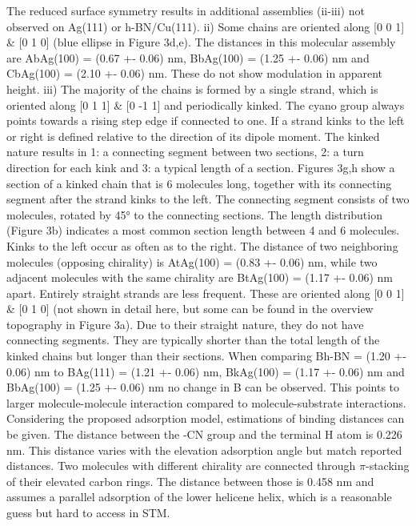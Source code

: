 The reduced surface symmetry results in additional assemblies (ii-iii) not observed on Ag(111) or h-BN/Cu(111). ii) Some chains are oriented along [0 0 1] \& [0 1 0] (blue ellipse in Figure 3d,e). The distances in this molecular assembly are AbAg(100) = (0.67 +- 0.06) nm, BbAg(100) = (1.25 +- 0.06) nm and CbAg(100) = (2.10 +- 0.06) nm. These do not show modulation in apparent height. iii) The majority of the chains is formed by a single strand, which is oriented along [0 1 1] \& [0 -1 1] and periodically kinked. The cyano group always points towards a rising step edge if connected to one. If a strand kinks to the left or right is defined relative to the direction of its dipole moment. The kinked nature results in 1: a connecting segment between two sections, 2: a turn direction for each kink and 3: a typical length of a section. Figures 3g,h show a section of a kinked chain that is 6 molecules long, together with its connecting segment after the strand kinks to the left. The connecting segment consists of two molecules, rotated by 45° to the connecting sections. The length distribution (Figure 3b) indicates a most common section length between 4 and 6 molecules. Kinks to the left occur as often as to the right. The distance of two neighboring molecules (opposing chirality) is AtAg(100) = (0.83 +- 0.06) nm, while two adjacent molecules with the same chirality are BtAg(100) = (1.17 +- 0.06) nm apart. Entirely straight strands are less frequent. These are oriented along [0 0 1] \& [0 1 0] (not shown in detail here, but some can be found in the overview topography in Figure 3a). Due to their straight nature, they do not have connecting segments. They are typically shorter than the total length of the kinked chains but longer than their sections. When comparing Bh-BN = (1.20 +- 0.06) nm to BAg(111) = (1.21 +- 0.06) nm, BkAg(100) = (1.17 +- 0.06) nm and BbAg(100) = (1.25 +- 0.06) nm no change in B can be observed. This points to larger molecule-molecule interaction compared to molecule-substrate interactions. Considering the proposed adsorption model, estimations of binding distances can be given. The distance between the -CN group and the terminal H atom is 0.226 nm. This distance varies with the elevation adsorption angle but match reported distances.\cite{} Two molecules with different chirality are connected through $\pi$-stacking of their elevated carbon rings. The distance between those is 0.458 nm and assumes a parallel adsorption of the lower helicene helix, which is a reasonable guess but hard to access in STM.

